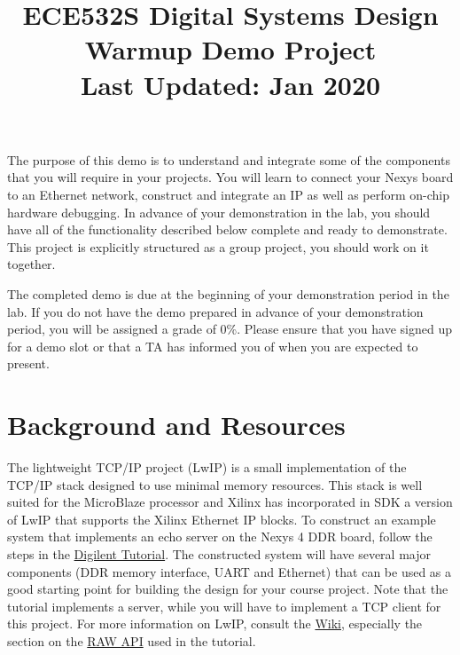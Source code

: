 \documentclass[11pt]{article}
\title{ECE532S Digital Systems Design \\ \vspace{0.4cm}
       \Large Warmup Demo Project \\ \vspace{0.4cm}
       \small Last Updated: Jan 2020}
\author{ }
\date{ }
\begin{document}
\maketitle
\vspace{-1cm}

The purpose of this demo is to understand and integrate some of the components that you will require in your projects. You will learn to connect your Nexys board to an Ethernet network, construct and integrate an IP as well as perform on-chip hardware debugging. In advance of your demonstration in the lab, you should have all of the functionality described below complete and ready to demonstrate. This project is explicitly structured as a group project, you should work on it together.

The completed demo is due at the beginning of your demonstration period in the lab. If you do not have the demo prepared in advance of your demonstration period, you will be assigned a grade of 0\%. Please ensure that you have signed up for a demo slot or that a TA has informed you of when you are expected to present.




\section{Background and Resources}
\label{sec:back}
The lightweight TCP/IP project (LwIP) is a small implementation of the TCP/IP stack designed to use minimal memory resources.
This stack is well suited for the MicroBlaze processor and Xilinx has incorporated in SDK a version of LwIP that supports the Xilinx Ethernet IP blocks.
To construct an example system that implements an echo server on the Nexys 4 DDR board, follow the steps in the
\href{https://reference.digilentinc.com/learn/programmable-logic/tutorials/nexys-4-ddr-getting-started-with-microblaze-servers/start}{\color{blue}Digilent Tutorial}.
The constructed system will have several major components (DDR memory interface, UART and Ethernet) that can be used as a good starting point for building the design for your course project.
Note that the tutorial implements a server, while you will have to implement a TCP client for this project.
For more information on LwIP, consult the \href{http://lwip.wikia.com/wiki/LwIP_Wiki}{\color{blue}Wiki}, especially the section on the \href{http://lwip.wikia.com/wiki/Raw/TCP}{\color{blue}RAW API} used in the tutorial.
\end{document}
